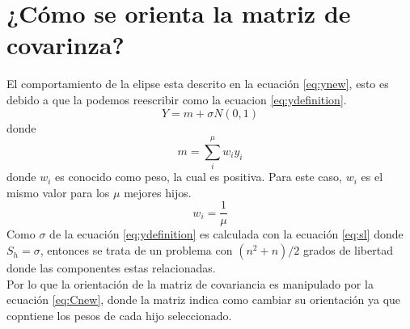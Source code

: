 \section{¿Cómo se orienta la matriz de covarinza?}
El comportamiento de la elipse esta descrito en la ecuación \ref{eq:ynew}, esto es debido a que la podemos reescribir como la ecuacion \ref{eq:ydefinition}. \cite{conference_hansen_2013_page_25}
\begin{equation}
    Y= m+\sigma N(0,1)
    \label{eq:ydefinition}
\end{equation}
donde
\begin{equation*}
    m = \sum_i^\mu w_i y_i
\end{equation*}
donde $w_i$ es conocido como peso, la cual es positiva. Para este caso, $w_i$ es el mismo valor para los $\mu$ mejores hijos.
\begin{equation*}
    w_i = \frac{1}{\mu}
\end{equation*}
Como $\sigma$ de la ecuación \ref{eq:ydefinition} es calculada con la ecuación \ref{eq:sl} donde $S_h=\sigma$, entonces se trata de un problema con $(n^2+n)/2$ grados de libertad donde las componentes estas relacionadas.\cite{conference_hansen_2013_page_21}\\

Por lo que la orientación de la matriz de covariancia es manipulado por la ecuación \ref{eq:Cnew}, donde la matriz  indica como cambiar su orientación ya que copntiene los pesos de cada hijo seleccionado.